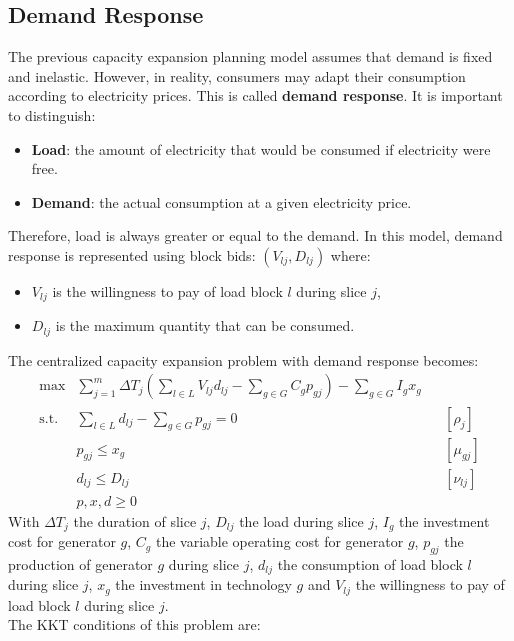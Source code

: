 \documentclass[12pt, openany]{report}
\theoremstyle{definition}
\begin{document}
\subsection{Demand Response}
The previous capacity expansion planning model assumes that demand is fixed and inelastic. However, in reality, consumers may adapt their consumption according to electricity prices. This is called \textbf{demand response}. It is important to distinguish:
\begin{itemize}
    \item \textbf{Load}: the amount of electricity that would be consumed if     electricity were free.
    \item \textbf{Demand}: the actual consumption at a given electricity price.
\end{itemize}
Therefore, load is always greater or equal to the demand. In this model, demand response is represented using block bids: $(V_{lj},D_{lj})$ where:
\begin{itemize}
    \item $V_{lj}$ is the willingness to pay of load block $l$ during slice $j$,
    \item $D_{lj}$ is the maximum quantity that can be consumed.
\end{itemize}
The centralized capacity expansion problem with demand response becomes:
\begin{equation}
    \begin{aligned}
        \max &\sum_{j=1}^m \Delta T_j \left( \sum_{l\in L} V_{lj} d_{lj} - \sum_{g\in G} C_g p_{gj} \right) - \sum_{g\in G} I_g x_g &&\\
        \text{s.t. } &\sum_{l\in L} d_{lj} - \sum_{g\in G} p_{gj} = 0 && [\rho_j] \\
        &p_{gj} \leq x_g && [\mu_{gj}] \\
        &d_{lj} \leq D_{lj} && [\nu_{lj}] \\
        &p, x, d \geq 0
    \end{aligned}
\end{equation}
With $\Delta T_j$ the duration of slice $j$, $D_{lj}$ the load during slice $j$, $I_g$ the investment cost for generator $g$, $C_g$ the variable operating cost for generator $g$, $p_{gj}$ the production of generator $g$ during slice $j$, $d_{lj}$ the consumption of load block $l$ during slice $j$, $x_g$ the investment in technology $g$ and $V_{lj}$ the willingness to pay of load block $l$ during slice $j$.\\
The KKT conditions of this problem are:
\end{document}
